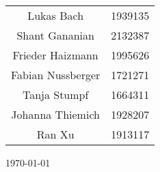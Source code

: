\begin{titlepage}
	\vspace{6cm}
	\centering
	{\Huge\bfseries \titleFirstRow\par}
	\vspace{0.5cm}
	{\scshape\Large \titleSecondRow\par}
	\vspace{1.5cm}
	{\scshape\Large \titleThirdRow\par}
	\vspace{2cm}
	{\Large\itshape \@author\par}
	{\small \belowAuthor\par}
	\begin{tabular}{cc}
		Lukas Bach & 1939135 \\
		Shant Gananian & 2132387 \\
		Frieder Haizmann & 1995626 \\
		Fabian Nussberger & 1721271 \\
		Tanja Stumpf & 1664311 \\
		Johanna Thiemich & 1928207 \\
		Ran Xu & 1913117 \\
	\end{tabular}
	\vfill
	\titleBottomFirst\par
	\titleBottomSecond
	
	\vfill
	
	{\large \today\par}
\end{titlepage}